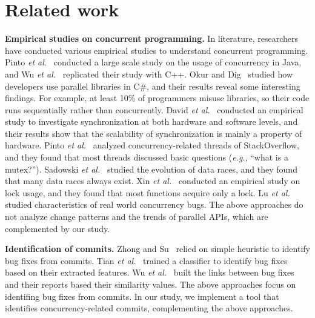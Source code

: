 \section{Related work}
\label{sec:related}
\noindent
\textbf{Empirical studies on concurrent programming.} In literature, researchers have conducted various empirical studies to understand concurrent programming. Pinto \emph{et al.}~\cite{journals/jss/PintoTFFB15} conducted a large scale study on the usage of concurrency in Java, and Wu \emph{et al.}~\cite{journals/infsof/WuCZX16} replicated their study with C++. Okur and Dig~\cite{conf/sigsoft/OkurD12} studied how developers use parallel libraries in C\#, and their results reveal some interesting findings. For example, at least 10\% of programmers misuse libraries, so their code runs sequentially rather than concurrently. David \emph{et al.}~\cite{conf/sosp/DavidGT13} conducted an empirical study to investigate synchronization at both hardware and software levels, and their results show that the scalability of synchronization is mainly a property of hardware. Pinto \emph{et al.}~\cite{conf/oopsla/PintoTC15} analyzed concurrency-related threads of StackOverflow, and they found that most threads discussed basic questions (\emph{e.g.}, ``what is a mutex?''). Sadowski \emph{et al.}~\cite{conf/msr/SadowskiYK12} studied the evolution of data races, and they found that many data races always exist. Xin \emph{et al.}~\cite{conf/icsm/XinQHXZWG13} conducted an empirical study on lock usage, and they found that most functions acquire only a lock. Lu \emph{et al.}~\cite{conf/asplos/LuPSZ08} studied characteristics of real world concurrency bugs. The above approaches do not analyze change patterns and the trends of parallel APIs, which are complemented by our study.


\noindent
\textbf{Identification of commits.} Zhong and Su~\cite{zhong2015bugfix} relied on simple heuristic to identify bug fixes from commits. Tian \emph{et al.}~\cite{tian2012identifying} trained a classifier to identify bug fixes based on their extracted features. Wu \emph{et al.}~\cite{wu2011relink} built the links between bug fixes and their reports based their similarity values. The above approaches focus on identifing bug fixes from commits. In our study, we implement a tool that identifies concurrency-related commits, complementing the above approaches.

